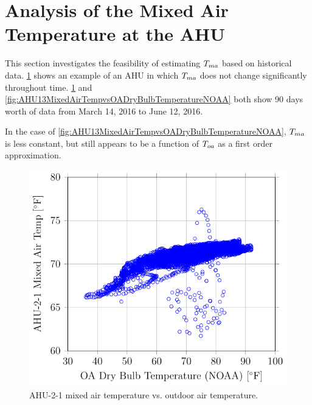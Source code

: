 \section{Analysis of the Mixed Air Temperature at the AHU}

This section investigates the feasibility of estimating \(T_{ma}\) based on
historical data. \figref{}
\ref{fig:AHU21MixedAirTempvsOADryBulbTemperatureNOAA} shows an example of an
AHU in which \(T_{ma}\) does not change significantly throughout time. \figref{}
\ref{fig:AHU21MixedAirTempvsOADryBulbTemperatureNOAA} and
\ref{fig:AHU13MixedAirTempvsOADryBulbTemperatureNOAA} both show 90 days worth
of data from March 14, 2016 to June 12, 2016. 

In the case of \figref{}
\ref{fig:AHU13MixedAirTempvsOADryBulbTemperatureNOAA}, \(T_{ma}\) is less
constant, but still appears to be a function of \(T_{oa}\) as a first
order approximation. 


\begin{figure}
\centering
\includegraphics[]{Plots/2016-06-13-1441-AHU21MixedAirTempvsOADryBulbTemperatureNOAA.pdf}
\caption{AHU-2-1 mixed air temperature vs. outdoor air temperature.}
\label{fig:AHU21MixedAirTempvsOADryBulbTemperatureNOAA}
\end{figure}


